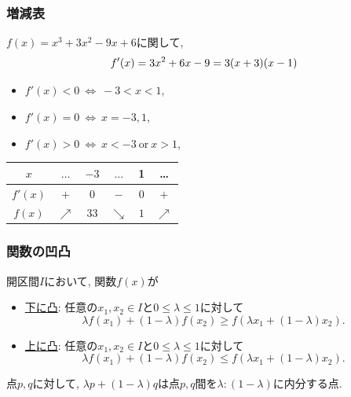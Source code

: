 


\begin{frame}
\frametitle{増減表}

$f(x)=x^3+3x^2-9x+6$に関して, 
$$
f'(x)=3x^2+6x-9=3(x+3)(x-1) \vspace{-4.5mm}
$$
\begin{itemize}
\item $f'(x)<0 \ \Leftrightarrow \ -3<x<1$, 
\item $f'(x)=0 \ \Leftrightarrow \ x=-3,1$, 
\item $f'(x)>0 \ \Leftrightarrow \ x<-3 \ \text{or} \ x>1$, 
\end{itemize}

\begin{table}[htb]
\begin{center}
\begin{tabular}{c|c|c|c|c|c}
$x$ & $\dots$ & $-3$ & $\dots$ & 1 & \dots \\ \hline 
$f'(x)$   & $+$ & $0$  & $-$  & $0$ & $+$   \\ \hline 
$f(x)$   & $\nearrow$  & $33$ & $\searrow$  & $1$ &  $\nearrow$  
  \end{tabular}
  \end{center}
\end{table}

\end{frame}





\begin{frame}
\frametitle{関数の凹凸}


\begin{Def}
開区間$I$において, 関数$f(x)$が
\begin{itemize}
\item \underline{下に凸}: 任意の$x_1,x_2 \in I$と$0 \le \lambda \le 1$に対して
$$
\lambda f(x_1)+(1-\lambda)f(x_2) \ge f(\lambda x_1+(1-\lambda)x_2). 
$$
\item \underline{上に凸}: 任意の$x_1,x_2 \in I$と$0 \le \lambda \le 1$に対して
$$
\lambda f(x_1)+(1-\lambda)f(x_2) \le f(\lambda x_1+(1-\lambda)x_2). 
$$
\end{itemize}
\end{Def}

点$p,q$に対して, $\lambda p+(1-\lambda)q$は点$p,q$間を$\lambda:(1-\lambda)$に内分する点. 


\end{frame}


